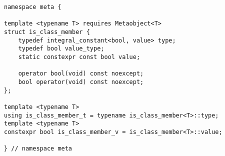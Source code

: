 
\begin{verbatim}
namespace meta {

template <typename T> requires Metaobject<T>
struct is_class_member {
	typedef integral_constant<bool, value> type;
	typedef bool value_type;
	static constexpr const bool value;

	operator bool(void) const noexcept;
	bool operator(void) const noexcept;
};

template <typename T>
using is_class_member_t = typename is_class_member<T>::type;
template <typename T>
constexpr bool is_class_member_v = is_class_member<T>::value;

} // namespace meta
\end{verbatim}
